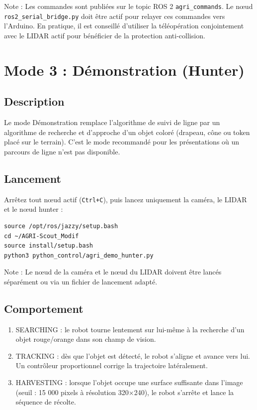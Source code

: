 \documentclass [12pt, a4paper]{article}
\begin{document}
Note : Les commandes sont publiées sur le topic ROS 2 \texttt{agri\_commands}. Le nœud \texttt{ros2\_serial\_bridge.py} doit être actif pour relayer ces commandes vers l'Arduino. En pratique, il est conseillé d'utiliser la téléopération conjointement avec le LIDAR actif pour bénéficier de la protection anti-collision.

\section{Mode 3 : Démonstration (Hunter)}

\subsection{Description}
Le mode Démonstration remplace l'algorithme de suivi de ligne par un algorithme de recherche et d'approche d'un objet coloré (drapeau, cône ou token placé sur le terrain). C'est le mode recommandé pour les présentations où un parcours de ligne n'est pas disponible.

\subsection{Lancement}
Arrêtez tout nœud actif (\texttt{Ctrl+C}), puis lancez uniquement la caméra, le LIDAR et le nœud hunter :
\begin{verbatim}
source /opt/ros/jazzy/setup.bash
cd ~/AGRI-Scout_Modif
source install/setup.bash
python3 python_control/agri_demo_hunter.py
\end{verbatim}

Note : Le nœud de la caméra et le nœud du LIDAR doivent être lancés séparément ou via un fichier de lancement adapté.

\subsection{Comportement}
\begin{enumerate}
    \item SEARCHING : le robot tourne lentement sur lui-même à la recherche d'un objet rouge/orange dans son champ de vision.
    \item TRACKING : dès que l'objet est détecté, le robot s'aligne et avance vers lui. Un contrôleur proportionnel corrige la trajectoire latéralement.
    \item HARVESTING : lorsque l'objet occupe une surface suffisante dans l'image (seuil : 15 000 pixels à résolution 320×240), le robot s'arrête et lance la séquence de récolte.
\end{enumerate}
\end{document}
